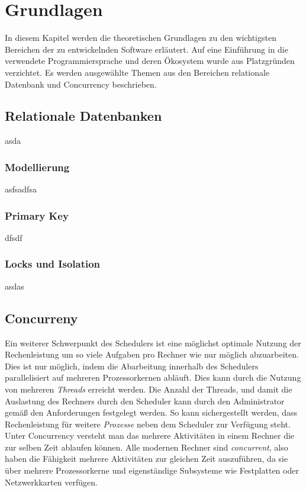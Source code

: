 \chapter{Grundlagen}\label{chap:Grundlagen}
\chapterstart
In diesem Kapitel werden die theoretischen Grundlagen zu den wichtigsten Bereichen der zu entwickelnden Software erläutert. Auf eine Einführung in die verwendete Programmiersprache und deren Ökosystem wurde aus Platzgründen verzichtet. Es werden ausgewählte Themen aus den Bereichen relationale Datenbank und Concurrency beschrieben.

\section{Relationale Datenbanken}
asda
\subsection{Modellierung}
asfsadfsa
\subsection{Primary Key}
dfsdf
\subsection{Locks und Isolation}
asdas
\section{Concurreny}
Ein weiterer Schwerpunkt des Schedulers ist eine möglichst optimale Nutzung der Rechenleistung um so viele Aufgaben pro Rechner wie nur möglich abzuarbeiten. Dies ist nur möglich, indem die Abarbeitung innerhalb des Schedulers parallelisiert auf mehreren Prozessorkernen abläuft. Dies kann durch die Nutzung von mehreren \emph{Threads} erreicht werden. Die Anzahl der Threads, und damit die Auslastung des Rechners durch den Scheduler kann durch den Administrator gemäß den Anforderungen festgelegt werden. So kann sichergestellt werden, dass Rechenleistung für weitere \emph{Prozesse} neben dem Scheduler zur Verfügung steht.
\\Unter Concurrency versteht man das mehrere Aktivitäten in einem Rechner die zur selben Zeit ablaufen können. Alle modernen Rechner sind \emph{concurrent}, also haben die Fähigkeit mehrere Aktivitäten zur gleichen Zeit auszuführen, da sie über mehrere Prozessorkerne und eigenständige Subsysteme wie Festplatten oder Netzwerkkarten verfügen.\cite{Anderson2014}
